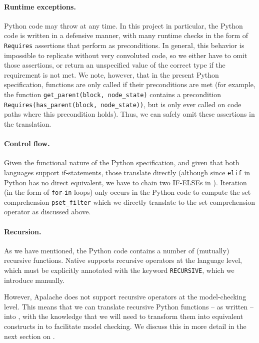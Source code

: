 \paragraph{Runtime exceptions.} Python code may throw at any time.
In this project in particular, the Python code is written in a defensive
manner, with many runtime checks in the form of \texttt{Requires} assertions
that perform as preconditions. 
In general, this behavior is impossible to replicate without very convoluted
\tlap{} code, so we either have to omit those assertions, or return an
unspecified value of the correct type if the requirement is not met.
We note, however, that in the present Python specification, functions are only
called if their preconditions are met (for example, the function
\texttt{get\_parent(block, node\_state)} contains a precondition
\texttt{Requires(has\_parent(block, node\_state))}, but is only ever called on
code paths where this precondition holds). Thus, we can safely omit these
assertions in the translation.

\paragraph{Control flow.} Given the functional nature of the Python
specification, and given that both languages support if-statements, those
translate directly (although since \texttt{elif} in Python has no direct
equivalent, we have to chain two IF-ELSEs in \tlap{}). Iteration (in the form of
\texttt{for}-\texttt{in} loops) only occurs in the Python code to compute the set
comprehension \texttt{pset\_filter} which we directly translate to the \tlap{}
set comprehension operator as discussed above.

\paragraph{Recursion.} As we have mentioned, the Python code contains a number
of (mutually) recursive functions. Native \tlap{} supports recursive operators
at the language level, which must be explicitly annotated with the keyword
\texttt{RECURSIVE}, which we introduce manually.

However, Apalache does not support recursive \tlap{} operators at the
model-checking level. This means that we can translate recursive Python
functions -- as written -- into \tlap{} \SpecOne{}, with the knowledge that we
will need to transform them into equivalent constructs in \SpecTwo{} to
facilitate model checking. We discuss this in more detail in the next section on
\SpecTwo{}.

